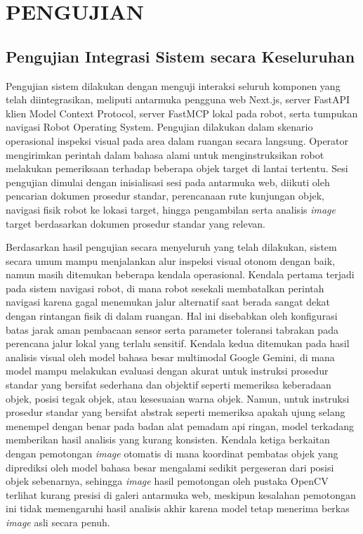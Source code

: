 \chapter{PENGUJIAN}
\label{sec:chap4_pengujian}
\vspace{1ex}

\section{Pengujian Integrasi Sistem secara Keseluruhan}
Pengujian sistem dilakukan dengan menguji interaksi seluruh komponen yang telah diintegrasikan, meliputi antarmuka pengguna web Next.js, server FastAPI klien Model Context Protocol, server FastMCP lokal pada robot, serta tumpukan navigasi Robot Operating System. Pengujian dilakukan dalam skenario operasional inspeksi visual pada area dalam ruangan secara langsung. Operator mengirimkan perintah dalam bahasa alami untuk menginstruksikan robot melakukan pemeriksaan terhadap beberapa objek target di lantai tertentu. Sesi pengujian dimulai dengan inisialisasi sesi pada antarmuka web, diikuti oleh pencarian dokumen prosedur standar, perencanaan rute kunjungan objek, navigasi fisik robot ke lokasi target, hingga pengambilan serta analisis \textit{image} target berdasarkan dokumen prosedur standar yang relevan.

Berdasarkan hasil pengujian secara menyeluruh yang telah dilakukan, sistem secara umum mampu menjalankan alur inspeksi visual otonom dengan baik, namun masih ditemukan beberapa kendala operasional. Kendala pertama terjadi pada sistem navigasi robot, di mana robot sesekali membatalkan perintah navigasi karena gagal menemukan jalur alternatif saat berada sangat dekat dengan rintangan fisik di dalam ruangan. Hal ini disebabkan oleh konfigurasi batas jarak aman pembacaan sensor serta parameter toleransi tabrakan pada perencana jalur lokal yang terlalu sensitif. Kendala kedua ditemukan pada hasil analisis visual oleh model bahasa besar multimodal Google Gemini, di mana model mampu melakukan evaluasi dengan akurat untuk instruksi prosedur standar yang bersifat sederhana dan objektif seperti memeriksa keberadaan objek, posisi tegak objek, atau kesesuaian warna objek. Namun, untuk instruksi prosedur standar yang bersifat abstrak seperti memeriksa apakah ujung selang menempel dengan benar pada badan alat pemadam api ringan, model terkadang memberikan hasil analisis yang kurang konsisten. Kendala ketiga berkaitan dengan pemotongan \textit{image} otomatis di mana koordinat pembatas objek yang diprediksi oleh model bahasa besar mengalami sedikit pergeseran dari posisi objek sebenarnya, sehingga \textit{image} hasil pemotongan oleh pustaka OpenCV terlihat kurang presisi di galeri antarmuka web, meskipun kesalahan pemotongan ini tidak memengaruhi hasil analisis akhir karena model tetap menerima berkas \textit{image} asli secara penuh.

